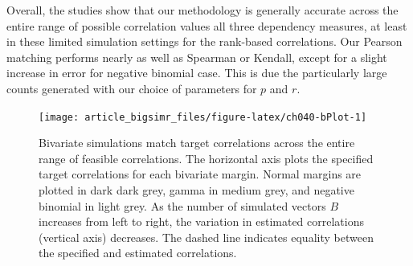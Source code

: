 \documentclass[
]{jss}
\begin{document}
Overall, the studies show that our methodology is generally accurate across the entire range of possible correlation values all three dependency measures, at least in these limited simulation settings for the rank-based correlations. Our Pearson matching performs nearly as well as Spearman or Kendall, except for a slight increase in error for negative binomial case. This is due the particularly large counts generated with our choice of parameters for \(p\) and \(r\).

\begin{CodeChunk}
\begin{figure}

{\centering \texttt{[image: article\_bigsimr\_files/figure-latex/ch040-bPlot-1]} 

}

\caption[Bivariate simulations match target correlations across the entire range of feasible correlations]{Bivariate simulations match target correlations across the entire range of feasible correlations. The horizontal axis plots the specified target correlations for each bivariate margin. Normal margins are plotted in dark dark grey, gamma in medium grey, and negative binomial in light grey. As the number of simulated vectors $B$ increases from left to right, the variation in estimated correlations (vertical axis) decreases. The dashed line indicates equality between the specified and estimated correlations.}\label{fig:ch040-bPlot}
\end{figure}
\end{CodeChunk}
\end{document}
